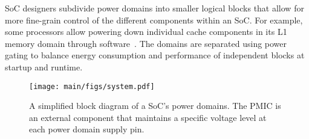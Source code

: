 SoC designers subdivide power domains into smaller logical blocks that allow for more fine-grain control of the different components within an SoC.  
For example, some processors allow powering down individual cache components in its L1 memory domain through software~\cite{A72}.
The domains are separated using power gating to balance energy consumption and performance of independent blocks at startup and runtime. 

 \begin{figure}
    \centering
    \texttt{[image: main/figs/system.pdf]}
    \caption{A simplified block diagram of a SoC's power domains. The PMIC is an external component that maintains a specific voltage level at each power domain supply pin.}
    \label{fig:system_block}
\end{figure}
\newcommand{\mdh}[1]{}\newcommand{\needrefs}{\textbf{[refs]\xspace}}
\newcommand{\needref}{\textbf{[ref]\xspace}}







\newcommand{\etal}{\emph{et al.}\xspace}
\newcommand{\eg}{\emph{e.g.,}\xspace}
\newcommand{\ie}{\emph{i.e.,}\xspace}
\newcommand{\steg}{steganography\xspace}
\newcommand{\sys}{\textit{Volt Boot}\xspace}


\newcommand{\lz}{$0$\xspace}
\newcommand{\lo}{$1$\xspace}

\newcommand{\cm}{\textbf{\textbf{\textcolor{red}{Comment:}}}\xspace}
\newcommand{\res}{\textbf{\textbf{\textcolor{blue}{Response:}}}\xspace}


\newcommand{\ask}[1]{\textbf{\textcolor{blue}{Question:~#1}}\\}
\newcommand{\todoJub}[1]{\textbf{\textcolor{red}{Jubayer's Note:~#1}}}



\newcommand{\bluecheck}{}\DeclareRobustCommand{\bluecheck}{\tikz\fill[scale=0.4, color=blue]
  (0,.35) -- (.25,0) -- (1,.7) -- (.25,.15) -- cycle;}
\newcommand{\poor}{ 
\begin{tikzpicture}
    \filldraw[fill = black, draw =black] (0,0) circle (3pt);
\end{tikzpicture}
     }

\newcommand{\good}{ 
\begin{tikzpicture}
    \filldraw[fill = white, draw =black] (0,0) circle (3pt);
\end{tikzpicture}
     }

\newcommand{\fair}{ 
\begin{tikzpicture}
    \filldraw[fill = white, draw =black] (0,0) circle (3pt);
   \fill[black] (0,0) -- (180:3pt) arc (180:0:3pt) -- cycle;
\end{tikzpicture}
     }
 

